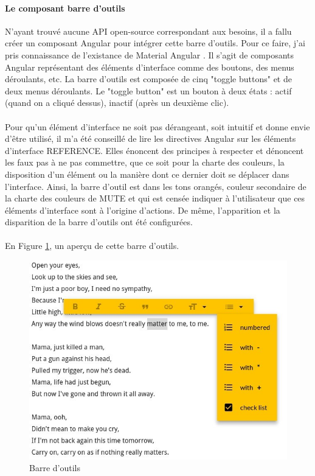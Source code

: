 \documentclass[12pt]{article}
\begin{document}
\paragraph{Le composant barre d'outils}
N'ayant trouvé aucune API open-source correspondant aux besoins, il a fallu créer un composant Angular pour intégrer cette barre d'outils. Pour ce faire, j'ai pris connaissance de l'existance de Material Angular \cite{tabs}. Il s'agit de composants Angular représentant des éléments d'interface comme des boutons, des menus déroulants, etc. La barre d'outils est composée de cinq "toggle buttons" et de deux menus déroulants. Le "toggle button" est un bouton à deux états : actif (quand on a cliqué dessus), inactif (après un deuxième clic).
\paragraph{}
Pour qu'un élément d'interface ne soit pas dérangeant, soit intuitif et donne envie d'être utilisé, il m'a été conseillé de lire les directives Angular sur les éléments d'interface REFERENCE. Elles énoncent des principes à respecter et dénoncent les faux pas à ne pas commettre, que ce soit pour la charte des couleurs, la disposition d'un élément ou la manière dont ce dernier doit se déplacer dans l'interface. Ainsi, la barre d'outil est dans les tons orangés, couleur secondaire de la charte des couleurs de MUTE et qui est censée indiquer à l'utilisateur que ces éléments d'interface sont à l'origine d'actions. De même, l'apparition et la disparition de la barre d'outils ont été configurées.
\paragraph{}
En Figure \ref{fig:gallery5}, un aperçu de cette barre d'outils. %
\begin{figure}[H]
    \centering
    \includegraphics[scale=0.8]{gallery/toolbar.jpg}
    \caption[nom dans le sommaire]{Barre d'outils}
    \label{fig:gallery5}
\end{figure}
\end{document}

